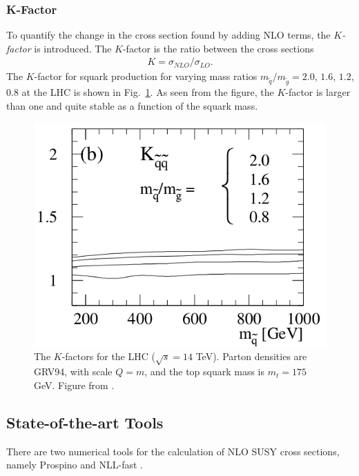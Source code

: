 \documentclass[twoside,english]{uiofysmaster}
\begin{document}
\subsubsection{K-Factor}

To quantify the change in the cross section found by adding NLO terms, the \textit{$K$-factor} is introduced. The $K$-factor is the ratio between the cross sections
\begin{align}
K = \sigma_{NLO}/\sigma_{LO}.
\end{align}
The $K$-factor for squark production for varying mass ratios $m_{\tilde{q}}/m_{\tilde{g}}=2.0$, $ 1.6$, $1.2$, $0.8$ at the LHC is shown in Fig.\ \ref{Fig:: susy hadron : K-factor LHC}. As seen from the figure, the $K$-factor is larger than one and quite stable as a function of the squark mass. 

\begin{figure}
\centering
\includegraphics[scale=0.5]{squark_gluino_K_factor.png}
\caption{The $K$-factors for the LHC ($\sqrt{s}=14$ TeV). Parton densities are GRV94, with scale $Q=m$, and the top squark mass is $m_t=175$ GeV. Figure from \cite{beenakker1997squark}.}
\label{Fig:: susy hadron : K-factor LHC}
\end{figure}


\subsection{State-of-the-art Tools}

There are two numerical tools for the calculation of NLO SUSY cross sections, namely Prospino \cite{beenakker1996prospino} and NLL-fast \cite{beenakker2016nlo+}.
\end{document}

